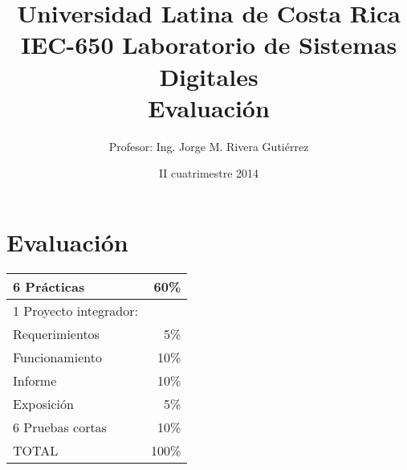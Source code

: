 \documentclass[11pt,letterpaper]{article}
\title{Universidad Latina de Costa Rica\\ IEC-650 Laboratorio de Sistemas Digitales\\ Evaluación}
\author{Profesor: Ing. Jorge M. Rivera Gutiérrez}
\date{II cuatrimestre 2014}
\begin{document}
\maketitle
\thispagestyle{empty}

\section*{Evaluación}

\begin{center}
\begin{tabular}{|l|r|}\hline
	6 Prácticas				&	60\%\\\hline
	1 Proyecto integrador:	&	\\
	\quad Requerimientos				&	5\%\\
	\quad Funcionamiento				&	10\%\\
	\quad Informe						&	10\%\\
	\quad Exposición					&	5\%\\\hline
	
	6 Pruebas cortas		&	10\%\\\hline\hline
	TOTAL					&	100\%\\\hline
\end{tabular}
\end{center}
\end{document}
